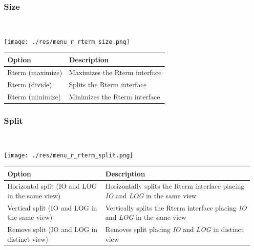 \hypertarget{menu_view_r_rterm_size}{}
\subsubsection{Size}\\

\texttt{[image: ./res/menu\_r\_rterm\_size.png]}\\

\begin{scriptsize}
  \begin{tabularx}{\textwidth}{>{\hsize=0.3\hsize}X>{\hsize=0.7\hsize}X}\\
    \hline
    \textbf{Option} & \textbf{Description} \\
    \hline
    Rterm (maximize) & Maximizes the Rterm interface \\
    Rterm (divide) & Splits the Rterm interface \\
    Rterm (minimize) & Minimizes the Rterm interface \\
    \hline
  \end{tabularx}
\end{scriptsize}


\hypertarget{menu_view_r_rterm_split}{}
\subsubsection{Split}\\

\texttt{[image: ./res/menu\_r\_rterm\_split.png]}\\

\begin{scriptsize}
  \begin{tabularx}{\textwidth}{>{\hsize=1\hsize}X>{\hsize=0.7\hsize}X}\\
    \hline
    \textbf{Option} & \textbf{Description} \\
    \hline
    Horizontal split (IO and LOG in the same view) & Horizontally splits the Rterm interface placing \textit{IO} and \textit{LOG} in the same view \\
    Vertical split (IO and LOG in the same view) & Vertically splits the Rterm interface placing \textit{IO} and \textit{LOG} in the same view \\
    Remove split (IO and LOG in distinct view) & Removes split placing \textit{IO} and \textit{LOG} in distinct view \\
    \hline
  \end{tabularx}
\end{scriptsize}


